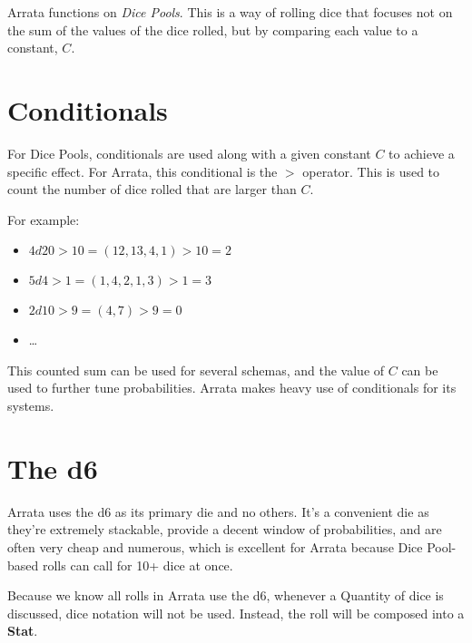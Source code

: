 \documentclass[../main.tex]{subfiles}
\begin{document}
    Arrata functions on {\em Dice Pools}. This is a way of rolling dice that focuses not on the sum of the values of the dice rolled, but by comparing each value to a constant, $C$.

    \section{Conditionals}

    For Dice Pools, conditionals are used along with a given constant $C$ to achieve a specific effect. For Arrata, this conditional is the $>$ operator. This is used to count the number of dice rolled that are larger than $C$.

    For example:

    \begin{itemize}
        \item $4d20>10 = (12, 13, 4, 1)>10 = 2$
        \item $5d4>1 = (1, 4, 2, 1, 3)>1 = 3$
        \item $2d10>9 = (4, 7)>9 = 0$
        \item \dots
    \end{itemize}

    This counted sum can be used for several schemas, and the value of $C$ can be used to further tune probabilities. Arrata makes heavy use of conditionals for its systems.

    \section{The d6}

    Arrata uses the d6 as its primary die and no others. It's a convenient die as they're extremely stackable, provide a decent window of probabilities, and are often very cheap and numerous, which is excellent for Arrata because Dice Pool-based rolls can call for 10+ dice at once.

    Because we know all rolls in Arrata use the d6, whenever a Quantity of dice is discussed, dice notation will not be used. Instead, the roll will be composed into a \textbf{Stat}.
\end{document}
